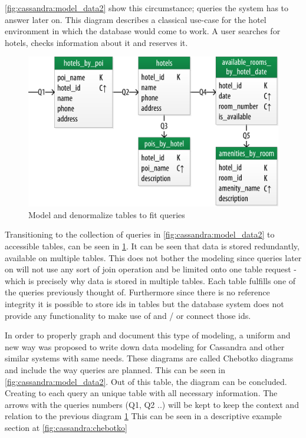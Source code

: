\ref{fig:cassandra:model_data2} show this circumstance; queries the system has to answer later on. This diagram describes a classical use-case for the hotel environment in which the database would come to work. A user searches for hotels, checks information about it and reserves it.

\begin{figure}[H]
    \centering
    \includegraphics[width=0.75\columnwidth]{img/model_example_chebotko_step3.png}
    \caption{Model and denormalize tables to fit queries \autocite{cassandra_oreilly}}
    \label{fig:cassandra:model_data3}
\end{figure}

Transitioning to the collection of queries in \ref{fig:cassandra:model_data2} to accessible tables, can be seen in \ref{fig:cassandra:model_data3}. It can be seen that data is stored redundantly, available on multiple tables. This does not bother the modeling since queries later on will not use any sort of join operation and be limited onto one table request - which is precisely why data is stored in multiple tables. Each table fulfills one of the queries previously thought of. Furthermore since there is no reference integrity it is possible to store ids in tables but the database system does not provide any functionality to make use of and / or connect those ids.

In order to properly graph and document this type of modeling, a uniform and new way was proposed to write down data modeling for Cassandra and other similar systems with same needs. \autocite{chebotko2015data}
These diagrams are called Chebotko diagrams and include the way queries are planned. This can be seen in \ref{fig:cassandra:model_data2}. 
Out of this table, the diagram can be concluded. Creating to each query an unique table with all necessary information. The arrows with the queries numbers (Q1, Q2 ..) will be kept to keep the context and relation to the previous diagram \ref{fig:cassandra:model_data3}
This can be seen in a descriptive example section at \ref{fig:cassandra:chebotko}

